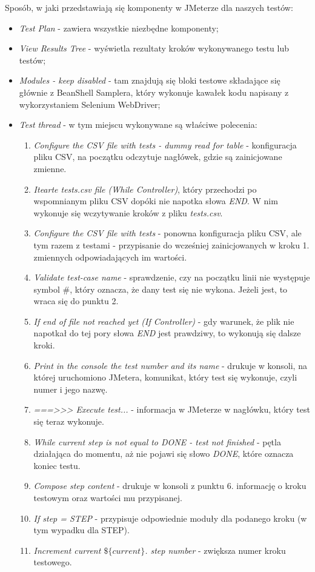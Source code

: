 Sposób, w jaki przedstawiają się komponenty w JMeterze dla naszych testów:
\begin{itemize}
    \item \textit{Test Plan} - zawiera wszystkie niezbędne komponenty;
    \item \textit{View Results Tree} - wyświetla rezultaty kroków wykonywanego testu lub testów;
    \item \textit{Modules - keep disabled} - tam znajdują się bloki testowe składające się głównie z BeanShell Samplera, który wykonuje kawałek kodu napisany z wykorzystaniem Selenium WebDriver;
    \item \textit{Test thread} - w tym miejscu wykonywane są właściwe polecenia:
    \begin{enumerate}
        \item \textit{Configure the CSV file with tests - dummy read for table} - konfiguracja pliku CSV, na początku odczytuje nagłówek, gdzie są zainicjowane zmienne.
        \item \textit{Itearte tests.csv file (While Controller)}, który przechodzi po wspomnianym pliku CSV dopóki nie napotka słowa \textit{END}. W nim wykonuje się wczytywanie kroków z pliku \textit{tests.csv}.
        \item \textit{Configure the CSV file with tests} - ponowna konfiguracja pliku CSV, ale tym razem z testami - przypisanie do wcześniej zainicjowanych w kroku 1. zmiennych odpowiadających im wartości.
        \item \textit{Validate test-case name} - sprawdzenie, czy na początku linii nie występuje symbol \#, który oznacza, że dany test się nie wykona. Jeżeli jest, to wraca się do punktu 2.
        \item \textit{If end of file not reached yet (If Controller)} - gdy warunek, że plik nie napotkał do tej pory słowa \textit{END} jest prawdziwy, to wykonują się dalsze kroki.
        \item \textit{Print in the console the test number and its name} - drukuje w konsoli, na której uruchomiono JMetera, komunikat, który test się wykonuje, czyli numer i jego nazwę.
        \item \textit{===>>> Execute test...} - informacja w JMeterze w nagłówku, który test się teraz wykonuje.
        \item \textit{While current step is not equal to DONE  - test not finished} - pętla działająca do momentu, aż nie pojawi się słowo \textit{DONE}, które oznacza koniec testu.
        \item \textit{Compose step content} - drukuje w konsoli z punktu 6. informację o kroku testowym oraz wartości mu przypisanej.
        \item \textit{If step = STEP} - przypisuje odpowiednie moduły dla podanego kroku (w tym wypadku dla STEP).
        \item \textit{Increment current $\$\{current\}$. step number} - zwiększa numer kroku testowego. 
    \end{enumerate}
\end{itemize}



